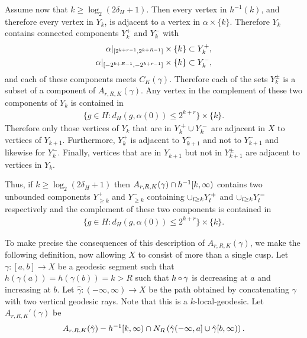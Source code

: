Assume now that $k \geq \log_2(2\delta_H + 1)$. Then every vertex in
$h^{-1}(k)$, and therefore every vertex in $Y_k$, is adjacent to a vertex in
$\alpha \times \{k\}$. Therefore $Y_k$ contains connected components $Y_k^+$
and $Y_k^-$ with
\begin{align*}
  \alpha\vert_{[2^{k+r-1}, 2^{k+R-1}]} \times \{k\} & \subset Y_k^+,\\
  \alpha\vert_{[-2^{k+R-1}, -2^{k+r-1}]} \times \{k\} & \subset Y_k^-,\\
\end{align*}
and each of these components meets $C_K(\gamma)$. Therefore each of the sets
$Y_k^\pm$ is a subset of a component of $A_{r, R, K}(\gamma)$. Any vertex in
the complement of these two components of $Y_k$ is contained in 
\begin{align*}
  \{g \in H \colon d_H(g, \alpha(0)) \leq 2^{k + r}\} \times \{k\}.
\end{align*}
Therefore only those vertices of $Y_k$ that are in $Y_k^+ \cup Y_k^-$ are
adjacent in $X$ to vertices of $Y_{k+1}$. Furthermore, $Y_k^+$ is adjacent to
$Y_{k+1}^+$ and not to $Y_{k+1}^-$ and likewise for $Y_k^-$. Finally, vertices
that are in $Y_{k+1}$ but not in $Y_{k+1}^\pm$ are adjacent to vertices in
$Y_k$.

Thus, if $k \geq \log_2(2\delta_H + 1)$ then $A_{r, R, K}(\gamma) \cap
h^{-1}[k, \infty)$ contains two unbounded components $Y_{\geq k}^+$ and
$Y_{\geq k}^-$ containing $\cup_{l \geq k} Y_l^+$ and $\cup_{l \geq k}
Y_l^-$ respectively and the complement of these two components is contained in
\begin{align*}
  \{g \in H \colon d_H(g, \alpha(0)) \leq 2^{k + r}\} \times \{k\}.
\end{align*}

To make precise the consequences of this description of $A_{r, R, K}(\gamma)$,
we make the following definition, now allowing $X$ to consist of more than a
single cusp. Let $\gamma\colon [a, b] \to X$ be a geodesic segment such that
$h(\gamma(a)) = h(\gamma(b)) = k > R$ such that $h \operatorname{\circ} \gamma$ is decreasing
at $a$ and increasing at $b$. Let $\hat\gamma \colon (-\infty, \infty) \to X$
be the path obtained by concatenating $\gamma$ with two vertical geodesic
rays.  Note that this is a $k$-local-geodesic. Let $A_{r, R, K}'(\gamma)$ be
\begin{align*}
A_{r, R, K}(\hat\gamma) - h^{-1}[k, \infty) \cap
  N_R\left(\hat\gamma (-\infty, a] \cup \hat\gamma[b, \infty)\right).
\end{align*} 

